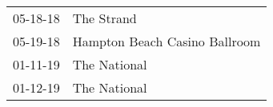 \begin{supertabular}{p{0.25\columnwidth}p{0.75\columnwidth}}
 05-18-18 &                     The Strand \\
 05-19-18 &  Hampton Beach Casino Ballroom \\
 01-11-19 &                   The National \\
 01-12-19 &                   The National \\
\end{supertabular}
